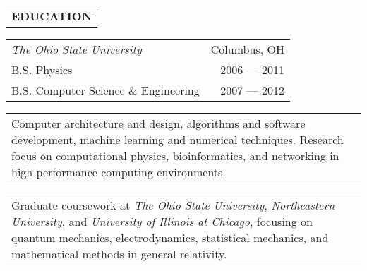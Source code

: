 \begin{tabularx}{\textwidth}{L}
    \textbf{EDUCATION}
\end{tabularx}

\begin{small}

\begin{tabularx}{\textwidth}{L R}
    \normalsize\textit{The Ohio State University} & Columbus, OH \\
    B.S. Physics & 2006 --- 2011 \\
    B.S. Computer Science \& Engineering & 2007 --- 2012 \\
\end{tabularx}
\begin{tabularx}{\textwidth}{X}
    \vspace{1pt}
    Computer architecture and design, algorithms and software development, machine learning and numerical techniques.
    Research focus on computational physics, bioinformatics, and networking in high performance computing environments.
\end{tabularx}
\begin{tabularx}{\textwidth}{X}
    \vspace{1pt}
    Graduate coursework at \textit{The Ohio State University}, \textit{Northeastern University}, and \textit{University of Illinois at Chicago},
    focusing on quantum mechanics, electrodynamics, statistical mechanics, and mathematical methods in general relativity.
\end{tabularx}

\end{small}
